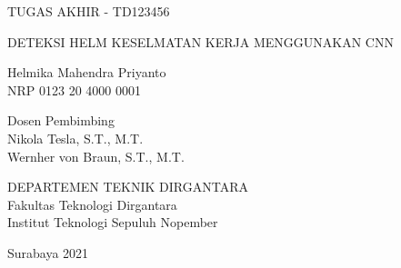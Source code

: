 TUGAS AKHIR - TD123456

\vspace{6ex}

\begin{large}
  DETEKSI HELM KESELMATAN KERJA MENGGUNAKAN CNN
\end{large}

\vspace{4ex}

Helmika Mahendra Priyanto \\
NRP 0123 20 4000 0001

\vspace{2ex}

Dosen Pembimbing \\
Nikola Tesla, S.T., M.T. \\
Wernher von Braun, S.T., M.T.

\vspace{6ex}

DEPARTEMEN TEKNIK DIRGANTARA \\
Fakultas Teknologi Dirgantara \\
Institut Teknologi Sepuluh Nopember

Surabaya 2021
